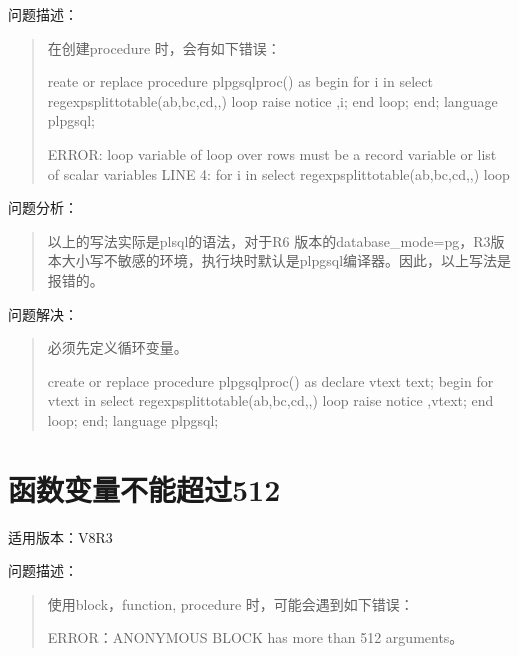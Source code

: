 \documentclass[a4,10pt,oneside,english]{sphinxmanual}
\begin{document}
问题描述：
\begin{quote}

在创建procedure 时，会有如下错误：

\begin{sphinxVerbatim}[commandchars=\\\{\}]
reate or replace procedure plpgsql\PYGZus{}proc() as
\PYGZdl{}\PYGZdl{}
begin
  for i in select regexp\PYGZus{}split\PYGZus{}to\PYGZus{}table(\PYGZsq{}ab,bc,cd\PYGZsq{},\PYGZsq{},\PYGZsq{}) loop
    raise notice \PYGZsq{}\PYGZpc{}\PYGZsq{},i;
  end loop;
end;
\PYGZdl{}\PYGZdl{} language plpgsql;

ERROR:  loop variable of loop over rows must be a record variable or list of scalar variables
LINE 4:   for i in select regexp\PYGZus{}split\PYGZus{}to\PYGZus{}table(\PYGZsq{}ab,bc,cd\PYGZsq{},\PYGZsq{},\PYGZsq{}) loop
\end{sphinxVerbatim}
\end{quote}

问题分析：
\begin{quote}

以上的写法实际是plsql的语法，对于R6 版本的database\_mode=pg，R3版本大小写不敏感的环境，执行块时默认是plpgsql编译器。因此，以上写法是报错的。
\end{quote}

问题解决：
\begin{quote}

必须先定义循环变量。

\begin{sphinxVerbatim}[commandchars=\\\{\}]
create or replace procedure plpgsql\PYGZus{}proc() as
\PYGZdl{}\PYGZdl{}
declare
  v\PYGZus{}text text;
begin
  for v\PYGZus{}text in select regexp\PYGZus{}split\PYGZus{}to\PYGZus{}table(\PYGZsq{}ab,bc,cd\PYGZsq{},\PYGZsq{},\PYGZsq{}) loop
    raise notice \PYGZsq{}\PYGZpc{}\PYGZsq{},v\PYGZus{}text;
  end loop;
end;
\PYGZdl{}\PYGZdl{} language plpgsql;
\end{sphinxVerbatim}
\end{quote}


\section{函数变量不能超过512}
\label{\detokenize{plsql:id1}}
适用版本：V8R3

问题描述：
\begin{quote}

使用block，function, procedure 时，可能会遇到如下错误：

\begin{sphinxVerbatim}[commandchars=\\\{\}]
ERROR：ANONYMOUS BLOCK has more than 512 arguments。
\end{sphinxVerbatim}
\end{quote}
\end{document}

